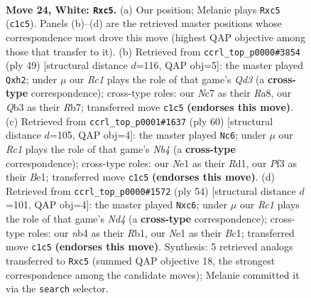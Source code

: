 \documentclass[11pt]{article}
\begin{document}
\clearpage

\begin{figure}[p]\centering
\begin{subfigure}{0.46\textwidth}\centering
\resizebox{\linewidth}{!}{%
\newchessgame
\chessboard[
  setfen={r1b4r/1pN3k1/1n6/2b3pp/1n5q/1Q1P1P2/P3p1B1/2R1NRK1 w - - 0 24},
  showmover=false,
  pgfstyle=straightmove, color=movearrow, markmove={c1-c5}
]}
\caption{}
\end{subfigure}\hfill
\begin{subfigure}{0.46\textwidth}\centering
\resizebox{\linewidth}{!}{%
\newchessgame
\chessboard[
  setfen={r5k1/1r4p1/3qb1B1/p2p3p/2n5/PN3P2/2Q1N2P/R3K1R1 b Q - 0 25},
  showmover=false,
  pgfstyle=straightmove, color=movearrow, markmove={d6-h2}
]}
\caption{}
\end{subfigure}
\\[4pt]
\begin{subfigure}{0.46\textwidth}\centering
\resizebox{\linewidth}{!}{%
\newchessgame
\chessboard[
  setfen={2bqr1k1/2n3b1/3p2pp/1p1P4/1N2n3/5NP1/2Q2PB1/3RB1K1 w - - 2 31},
  showmover=false,
  pgfstyle=straightmove, color=movearrow, markmove={b4-c6}
]}
\caption{}
\end{subfigure}\hfill
\begin{subfigure}{0.46\textwidth}\centering
\resizebox{\linewidth}{!}{%
\newchessgame
\chessboard[
  setfen={1bbqr1k1/5pp1/r1n5/pN6/2pN1P1p/P3P2P/6Q1/1RB2RK1 w - - 0 28},
  showmover=false,
  pgfstyle=straightmove, color=movearrow, markmove={d4-c6}
]}
\caption{}
\end{subfigure}
\caption{\textbf{Move 24, White: \texttt{Rxc5}.} (a) Our position; Melanie plays \texttt{Rxc5} (\texttt{c1c5}). Panels (b)--(d) are the retrieved master positions whose correspondence most drove this move (highest QAP objective among those that transfer to it). (b) Retrieved from \texttt{ccrl\_top\_p0000\#3854} (ply 49) [structural distance $d$=116, QAP obj=5]: the master played \texttt{Qxh2}; under $\mu$ our \emph{Rc1} plays the role of that game's \emph{Qd3} (a \textbf{cross-type} correspondence); cross-type roles: our \emph{N}c7 as their \emph{R}a8, our \emph{Q}b3 as their \emph{R}b7; transferred move \texttt{c1c5} \textbf{(endorses this move)}. (c) Retrieved from \texttt{ccrl\_top\_p0001\#1637} (ply 60) [structural distance $d$=105, QAP obj=4]: the master played \texttt{Nc6}; under $\mu$ our \emph{Rc1} plays the role of that game's \emph{Nb4} (a \textbf{cross-type} correspondence); cross-type roles: our \emph{N}e1 as their \emph{R}d1, our \emph{P}f3 as their \emph{B}e1; transferred move \texttt{c1c5} \textbf{(endorses this move)}. (d) Retrieved from \texttt{ccrl\_top\_p0000\#1572} (ply 54) [structural distance $d$=101, QAP obj=4]: the master played \texttt{Nxc6}; under $\mu$ our \emph{Rc1} plays the role of that game's \emph{Nd4} (a \textbf{cross-type} correspondence); cross-type roles: our \emph{n}b4 as their \emph{R}b1, our \emph{N}e1 as their \emph{B}c1; transferred move \texttt{c1c5} \textbf{(endorses this move)}. Synthesis: 5 retrieved analogs transferred to \texttt{Rxc5} (summed QAP objective 18, the strongest correspondence among the candidate moves); Melanie committed it via the \texttt{search} selector.}
\label{fig:thought-m46}
\end{figure}
\end{document}
